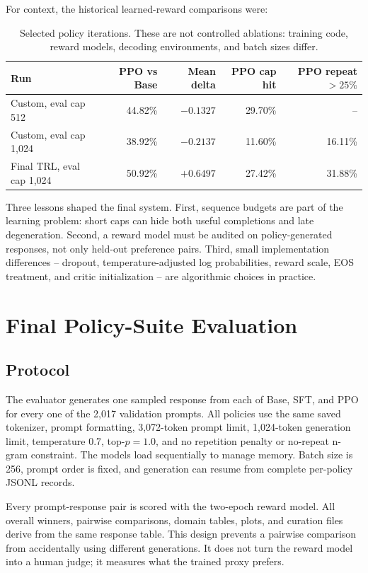 \documentclass[11pt]{article}
\newcommand{\trl}{\textsc{TRL}}
\begin{document}
For context, the historical learned-reward comparisons were:

\begin{table}[H]
\centering
\caption{Selected policy iterations. These are not controlled ablations:
training code, reward models, decoding environments, and batch sizes differ.}
\label{tab:iteration-results}
\small
\begin{tabular}{@{}lrrrr@{}}
\toprule
\textbf{Run} &
\textbf{PPO vs Base} &
\textbf{Mean delta} &
\textbf{PPO cap hit} &
\textbf{PPO repeat $>25\%$}\\
\midrule
Custom, eval cap 512 & 44.82\% & $-0.1327$ & 29.70\% & --\\
Custom, eval cap 1,024 & 38.92\% & $-0.2137$ & 11.60\% & 16.11\%\\
Final \trl{}, eval cap 1,024 & 50.92\% & $+0.6497$ & 27.42\% & 31.88\%\\
\bottomrule
\end{tabular}
\end{table}

Three lessons shaped the final system. First, sequence budgets are part of the
learning problem: short caps can hide both useful completions and late
degeneration. Second, a reward model must be audited on policy-generated
responses, not only held-out preference pairs. Third, small implementation
differences -- dropout, temperature-adjusted log probabilities, reward scale,
EOS treatment, and critic initialization -- are algorithmic choices in
practice.

\section{Final Policy-Suite Evaluation}

\subsection{Protocol}

The evaluator generates one sampled response from each of Base, SFT, and PPO
for every one of the 2,017 validation prompts. All policies use the same saved
tokenizer, prompt formatting, 3,072-token prompt limit, 1,024-token generation
limit, temperature 0.7, top-$p=1.0$, and no repetition penalty or no-repeat
n-gram constraint. The models load sequentially to manage memory. Batch size
is 256, prompt order is fixed, and generation can resume from complete
per-policy JSONL records.

Every prompt-response pair is scored with the two-epoch reward model. All
overall winners, pairwise comparisons, domain tables, plots, and curation
files derive from the same response table. This design prevents a pairwise
comparison from accidentally using different generations. It does not turn
the reward model into a human judge; it measures what the trained proxy
prefers.
\end{document}
